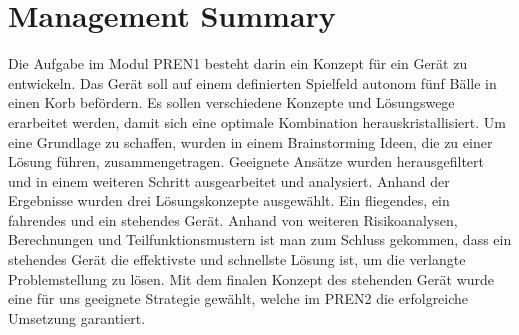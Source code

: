 \section*{Management Summary}
Die Aufgabe im Modul PREN1 besteht darin ein Konzept für ein Gerät zu 
entwickeln. Das Gerät soll auf einem definierten Spielfeld autonom 
fünf Bälle in einen Korb befördern. Es sollen verschiedene Konzepte und 
Lösungswege erarbeitet werden, damit sich eine optimale Kombination herauskristallisiert. 
Um eine Grundlage zu schaffen, wurden in einem Brainstorming Ideen, die zu 
einer Lösung führen, zusammengetragen. Geeignete Ansätze wurden herausgefiltert 
und in einem weiteren Schritt ausgearbeitet und analysiert. Anhand der 
Ergebnisse wurden drei Lösungskonzepte ausgewählt. Ein fliegendes, 
ein fahrendes und ein stehendes Gerät. Anhand von weiteren Risikoanalysen, 
Berechnungen und Teilfunktionsmustern ist man zum Schluss gekommen, dass ein 
stehendes Gerät die effektivste und schnellste Lösung ist, um die verlangte 
Problemstellung zu lösen. Mit dem finalen Konzept des stehenden Gerät wurde 
eine für uns geeignete Strategie gewählt, welche im PREN2 die erfolgreiche 
Umsetzung garantiert.
